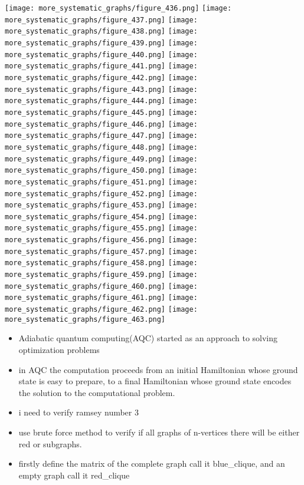 \documentclass{Assignment}
\begin{document}
\texttt{[image: more\_systematic\_graphs/figure\_436.png]}
\texttt{[image: more\_systematic\_graphs/figure\_437.png]}
\texttt{[image: more\_systematic\_graphs/figure\_438.png]}
\texttt{[image: more\_systematic\_graphs/figure\_439.png]}
\texttt{[image: more\_systematic\_graphs/figure\_440.png]}
\texttt{[image: more\_systematic\_graphs/figure\_441.png]}
\texttt{[image: more\_systematic\_graphs/figure\_442.png]}
\texttt{[image: more\_systematic\_graphs/figure\_443.png]}
\texttt{[image: more\_systematic\_graphs/figure\_444.png]}
\texttt{[image: more\_systematic\_graphs/figure\_445.png]}
\texttt{[image: more\_systematic\_graphs/figure\_446.png]}
\texttt{[image: more\_systematic\_graphs/figure\_447.png]}
\texttt{[image: more\_systematic\_graphs/figure\_448.png]}
\texttt{[image: more\_systematic\_graphs/figure\_449.png]}
\texttt{[image: more\_systematic\_graphs/figure\_450.png]}
\texttt{[image: more\_systematic\_graphs/figure\_451.png]}
\texttt{[image: more\_systematic\_graphs/figure\_452.png]}
\texttt{[image: more\_systematic\_graphs/figure\_453.png]}
\texttt{[image: more\_systematic\_graphs/figure\_454.png]}
\texttt{[image: more\_systematic\_graphs/figure\_455.png]}
\texttt{[image: more\_systematic\_graphs/figure\_456.png]}
\texttt{[image: more\_systematic\_graphs/figure\_457.png]}
\texttt{[image: more\_systematic\_graphs/figure\_458.png]}
\texttt{[image: more\_systematic\_graphs/figure\_459.png]}
\texttt{[image: more\_systematic\_graphs/figure\_460.png]}
\texttt{[image: more\_systematic\_graphs/figure\_461.png]}
\texttt{[image: more\_systematic\_graphs/figure\_462.png]}
\texttt{[image: more\_systematic\_graphs/figure\_463.png]}
\newpage
\begin{itemize}
	\item  Adiabatic quantum computing(AQC) started as an approach to solving optimization problems
	\item in AQC the computation proceeds from an initial Hamiltonian whose ground
	state is easy to prepare, to a final Hamiltonian whose
	ground state encodes the solution to the computational problem.
\end{itemize}
\newpage
\underline{}
\begin{itemize}
	\item i need to verify ramsey number 3
	\item use brute force method to verify if all graphs of n-vertices there will be either red or subgraphs. 
	\item firstly define the matrix of the complete graph call it blue\_clique, and an empty graph call it red\_clique
\end{itemize}
\end{document}
